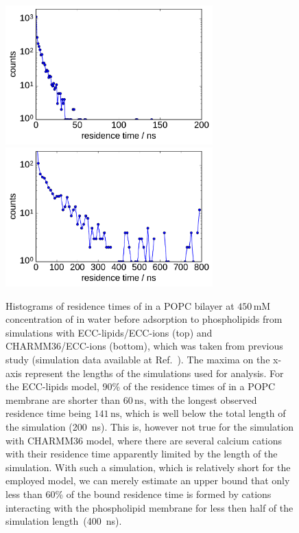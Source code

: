 \documentclass[aip,jcp,twocolumn]{revtex4}
\begin{document}
\begin{figure}[tbp!]
  \centering
  \includegraphics[width=8.0cm]{../Fig/ipython_nb/histogram_bound_times_ECC-lipids_346mM_CaCl.pdf} \\
  \includegraphics[width=8.0cm]{../Fig/ipython_nb/histogram_bound_times_Charmm36_450mM_CaCl_Matti.pdf}
  \caption{\label{fig:hist_residence_times}
   Histograms of residence times of  in a POPC bilayer 
   at $450\,\mathrm{mM}$ concentration of  in water before adsorption to phospholipids
   from simulations with ECC-lipids/ECC-ions (top)
   and CHARMM36/ECC-ions (bottom), which was taken from previous study \cite{javanainen17} 
   (simulation data available at Ref.~).
   The maxima on the x-axis represent the lengths of the simulations used for analysis. 
   For the ECC-lipids model, 90\% of the residence times of  in a POPC membrane are 
   shorter than $60\,\mathrm{ns}$, %
   with the longest observed residence time being $141\,\mathrm{ns}$, 
   which is well below the total length of the simulation (200~ns).
   This is, however not true for the simulation with CHARMM36 model,
   where there are several calcium cations with their residence time 
   apparently limited by the length of the simulation. 
   With such a simulation, which is relatively short for the employed model,
   we can merely estimate an upper bound that 
   only less than 60\% of the bound residence time 
   is formed by cations interacting with the phospholipid membrane 
   for less then half of the simulation length~(400~ns).
  }
\end{figure}
\end{document}
